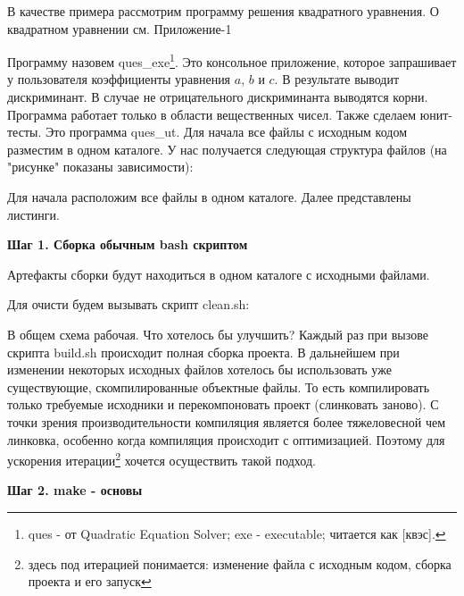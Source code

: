 В качестве примера рассмотрим программу решения квадратного уравнения. О квадратном уравнении см. Приложение-1

Программу назовем ques\_exe\footnote{ques - от Quadratic Equation Solver; exe - executable; читается как [квэс].}. Это консольное приложение, которое запрашивает у пользователя коэффициенты уравнения $a$, $b$ и $c$. В результате выводит дискриминант. В случае не отрицательного дискриминанта выводятся корни. Программа работает только в области вещественных чисел. Также сделаем юнит-тесты.  Это программа ques\_ut. Для начала все файлы с исходным кодом разместим в одном каталоге. У нас получается следующая структура файлов (на "рисунке" показаны зависимости):

\texttt{}

Для начала расположим все файлы в одном каталоге. Далее представлены листинги.








\textbf{Шаг 1. Сборка обычным bash скриптом}

Артефакты сборки будут находиться в одном каталоге с исходными файлами.



Для очисти будем вызывать скрипт clean.sh:



В общем схема рабочая. Что хотелось бы улучшить? Каждый раз при вызове скрипта build.sh происходит полная сборка проекта. В дальнейшем при изменении некоторых исходных файлов хотелось бы использовать уже существующие, скомпилированные объектные файлы. То есть компилировать только требуемые исходники и перекомпоновать проект (слинковать заново). С точки зрения производительности компиляция является более тяжеловесной чем линковка, особенно когда компиляция происходит с оптимизацией. Поэтому для ускорения итерации\footnote{здесь под итерацией понимается: изменение файла с исходным кодом, сборка проекта и его запуск} хочется осуществить такой подход.

\textbf{Шаг 2. make - основы}

